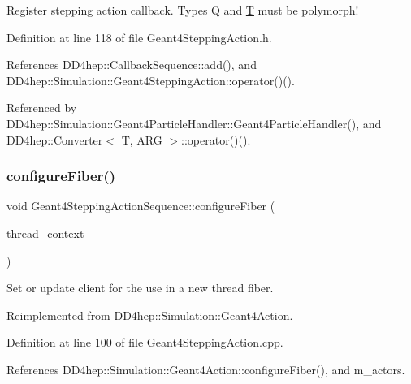 Register stepping action callback. Types Q and \hyperlink{class_t}{T} must be polymorph! 



Definition at line 118 of file Geant4\+Stepping\+Action.\+h.



References D\+D4hep\+::\+Callback\+Sequence\+::add(), and D\+D4hep\+::\+Simulation\+::\+Geant4\+Stepping\+Action\+::operator()().



Referenced by D\+D4hep\+::\+Simulation\+::\+Geant4\+Particle\+Handler\+::\+Geant4\+Particle\+Handler(), and D\+D4hep\+::\+Converter$<$ T, A\+R\+G $>$\+::operator()().

\hypertarget{class_d_d4hep_1_1_simulation_1_1_geant4_stepping_action_sequence_ad5680d2d225421b9cf2cd6b530d3ab5f}{}\label{class_d_d4hep_1_1_simulation_1_1_geant4_stepping_action_sequence_ad5680d2d225421b9cf2cd6b530d3ab5f} 
\subsubsection{\texorpdfstring{configure\+Fiber()}{configureFiber()}}
{\footnotesize\ttfamily void Geant4\+Stepping\+Action\+Sequence\+::configure\+Fiber (\begin{DoxyParamCaption}\item[{\hyperlink{class_d_d4hep_1_1_simulation_1_1_geant4_context}{Geant4\+Context} $\ast$}]{thread\+\_\+context }\end{DoxyParamCaption})\hspace{0.3cm}{\ttfamily [virtual]}}



Set or update client for the use in a new thread fiber. 



Reimplemented from \hyperlink{class_d_d4hep_1_1_simulation_1_1_geant4_action_a6adc7138508303e4e417cb48a737ab19}{D\+D4hep\+::\+Simulation\+::\+Geant4\+Action}.



Definition at line 100 of file Geant4\+Stepping\+Action.\+cpp.



References D\+D4hep\+::\+Simulation\+::\+Geant4\+Action\+::configure\+Fiber(), and m\+\_\+actors.

